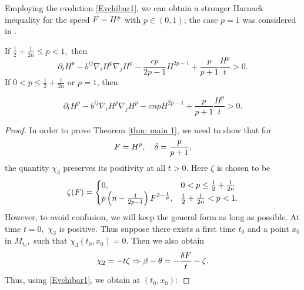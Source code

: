 \documentclass{amsart}
\begin{document}
Employing the evolution \cref{Evchibar1}, we can obtain a stronger Harnack inequality for the speed \(F = H^{p}\) with \(p \in (0,1)\); the case $p=1$ was considered in \cite{BryanIvaki:08/2015}.
\begin{theorem} \label{thm: main 1}
If $\frac{1}{2}+\frac{1}{2n}\leq {p}< 1,$ then
\[
\partial_t H^{p} - b^{ij}\nabla_iH^{p}\nabla_jH^{p} - \frac{c {p}}{2{p}-1}H^{2{p}-1} + \frac{{p}}{{p}+1} \frac{H^{p}}{t} > 0.
\]
If $0<{p}\leq \frac{1}{2} + \frac{1}{2n}$ or $p=1$, then

\[
\partial_t H^{p} - b^{ij}\nabla_iH^{p}\nabla_jH^{p} - c n{p}H^{2{p}-1} + \frac{{p}}{{p}+1} \frac{H^{p}}{t} > 0.
\]
\end{theorem}
\begin{proof}
In order to prove Theorem \ref{thm: main 1}, we need to show that for
$$F=H^{p},\quad \delta=\frac{p}{p+1},$$
the quantity $\chi_3$ preserves its positivity at all $t>0.$ Here $\zeta$ is chosen to be
$$\zeta(F)=\begin{cases} 0, &0<p\leq \frac{1}{2}+\frac{1}{2n}\\
                    p\left(n-\frac{1}{2p-1}\right)F^{2-\frac{1}{p}}, &\frac{1}{2}+\frac{1}{2n}<p< 1.\end{cases}$$
However, to avoid confusion, we will keep the general form as long as possible.
At time $t=0,$ $\chi_3$ is positive.
Thus suppose there exists a first time $t_0$ and a point $x_0$ in $M_{t_0},$ such that $\chi_3(t_0,x_0)=0.$
Then we also obtain
$$\chi_2=-t\zeta\Rightarrow \beta-\theta=-\frac{\delta F}{t}-\zeta.$$
Thus, using \eqref{Evchibar1}, we obtain at $(t_0,x_0):$


\end{proof}
\end{document}
